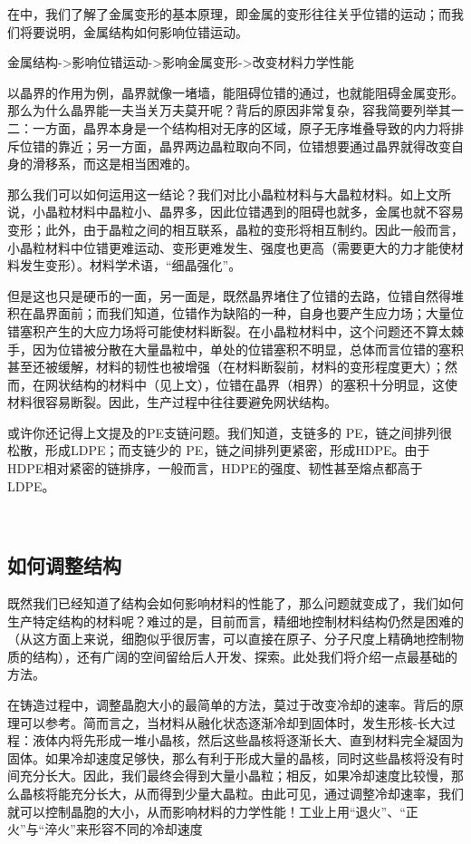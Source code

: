 在中，我们了解了金属变形的基本原理，即金属的变形往往关乎位错的运动；而我们将要说明，金属结构如何影响位错运动。

金属结构->影响位错运动->影响金属变形->改变材料力学性能

以晶界的作用为例，晶界就像一堵墙，能阻碍位错的通过，也就能阻碍金属变形。那么为什么晶界能一夫当关万夫莫开呢？背后的原因非常复杂，容我简要列举其一二：一方面，晶界本身是一个结构相对无序的区域，原子无序堆叠导致的内力将排斥位错的靠近；另一方面，晶界两边晶粒取向不同，位错想要通过晶界就得改变自身的滑移系，而这是相当困难的。

那么我们可以如何运用这一结论？我们对比小晶粒材料与大晶粒材料。如上文所说，小晶粒材料中晶粒小、晶界多，因此位错遇到的阻碍也就多，金属也就不容易变形；此外，由于晶粒之间的相互联系，晶粒的变形将相互制约。因此一般而言，小晶粒材料中位错更难运动、变形更难发生、强度也更高（需要更大的力才能使材料发生变形）。材料学术语，“细晶强化”。

但是这也只是硬币的一面，另一面是，既然晶界堵住了位错的去路，位错自然得堆积在晶界面前；而我们知道，位错作为缺陷的一种，自身也要产生应力场；大量位错塞积产生的大应力场将可能使材料断裂。在小晶粒材料中，这个问题还不算太棘手，因为位错被分散在大量晶粒中，单处的位错塞积不明显，总体而言位错的塞积甚至还被缓解，材料的韧性也被增强（在材料断裂前，材料的变形程度更大）；然而，在网状结构的材料中（见上文），位错在晶界（相界）的塞积十分明显，这使材料很容易断裂。因此，生产过程中往往要避免网状结构。

或许你还记得上文提及的PE支链问题。我们知道，支链多的 PE，链之间排列很松散，形成LDPE；而支链少的 PE，链之间排列更紧密，形成HDPE。由于HDPE相对紧密的链排序，一般而言，HDPE的强度、韧性甚至熔点都高于LDPE。

 
\subsection{如何调整结构}

既然我们已经知道了结构会如何影响材料的性能了，那么问题就变成了，我们如何生产特定结构的材料呢？难过的是，目前而言，精细地控制材料结构仍然是困难的（从这方面上来说，细胞似乎很厉害，可以直接在原子、分子尺度上精确地控制物质的结构），还有广阔的空间留给后人开发、探索。此处我们将介绍一点最基础的方法。

在铸造过程中，调整晶胞大小的最简单的方法，莫过于改变冷却的速率。背后的原理可以参考。简而言之，当材料从融化状态逐渐冷却到固体时，发生形核-长大过程：液体内将先形成一堆小晶核，然后这些晶核将逐渐长大、直到材料完全凝固为固体。如果冷却速度足够快，那么有利于形成大量的晶核，同时这些晶核将没有时间充分长大。因此，我们最终会得到大量小晶粒；相反，如果冷却速度比较慢，那么晶核将能充分长大，从而得到少量大晶粒。由此可见，通过调整冷却速率，我们就可以控制晶胞的大小，从而影响材料的力学性能！工业上用“退火”、“正火”与“淬火”来形容不同的冷却速度

